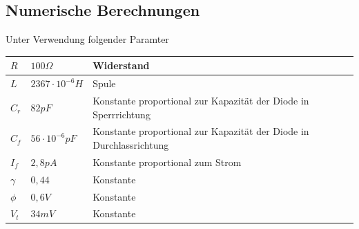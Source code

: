 \documentclass{scrartcl}
\begin{document}
\subsection{ Numerische Berechnungen } \label{ssec:num}
Unter Verwendung folgender Paramter
\begin{center}
    \begin{tabular}{ | l | l | p{5cm} |}
    \hline
    $R$ & $100\Omega$ & Widerstand \\ \hline
    $L$ & $2367\cdot10^{-6} H$ & Spule \\ \hline
    $C_r$ & $82 pF$ & Konstante proportional zur Kapazität der Diode in Sperrrichtung \\ \hline
    $C_f$ & $56 \cdot10^{-6}  pF$ & Konstante proportional zur Kapazität der Diode in Durchlassrichtung \\ \hline
    $I_f$ & $2,8pA$ & Konstante proportional zum Strom  \\ \hline
    $\gamma$ & $0,44$ & Konstante \\ \hline
    $\phi$ & $0,6V$ & Konstante \\ \hline
    $V_t$ & $34mV$ & Konstante \\
    \hline
    \end{tabular}
\end{center}
\end{document}
